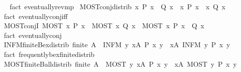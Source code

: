 \begin{isabellebody}
\isadelimproof
\ %
\endisadelimproof
%
\isatagproof
{}\isamarkupfalse%
\ {\isacharparenleft}fact\ eventually{\isacharunderscore}rev{\isacharunderscore}mp{\isacharparenright}%
\endisatagproof
{\isafoldproof}%
%
\isadelimproof
%
\endisadelimproof
\isanewline
{}\isamarkupfalse%
\ MOST{\isacharunderscore}conj{\isacharunderscore}distrib{\isacharcolon}\ {\isachardoublequoteopen}{\isacharparenleft}{\isasymforall}\isactrlsub {\isasyminfinity}x{\isachardot}\ P\ x\ {\isasymand}\ Q\ x{\isacharparenright}\ {\isasymlongleftrightarrow}\ {\isacharparenleft}{\isasymforall}\isactrlsub {\isasyminfinity}x{\isachardot}\ P\ x{\isacharparenright}\ {\isasymand}\ {\isacharparenleft}{\isasymforall}\isactrlsub {\isasyminfinity}x{\isachardot}\ Q\ x{\isacharparenright}{\isachardoublequoteclose}%
\isadelimproof
\ %
\endisadelimproof
%
\isatagproof
{}\isamarkupfalse%
\ {\isacharparenleft}fact\ eventually{\isacharunderscore}conj{\isacharunderscore}iff{\isacharparenright}%
\endisatagproof
{\isafoldproof}%
%
\isadelimproof
%
\endisadelimproof
\isanewline
{}\isamarkupfalse%
\ MOST{\isacharunderscore}conjI{\isacharcolon}\ {\isachardoublequoteopen}MOST\ x{\isachardot}\ P\ x\ {\isasymLongrightarrow}\ MOST\ x{\isachardot}\ Q\ x\ {\isasymLongrightarrow}\ MOST\ x{\isachardot}\ P\ x\ {\isasymand}\ Q\ x{\isachardoublequoteclose}%
\isadelimproof
\ %
\endisadelimproof
%
\isatagproof
{}\isamarkupfalse%
\ {\isacharparenleft}fact\ eventually{\isacharunderscore}conj{\isacharparenright}%
\endisatagproof
{\isafoldproof}%
%
\isadelimproof
%
\endisadelimproof
\isanewline
{}\isamarkupfalse%
\ INFM{\isacharunderscore}finite{\isacharunderscore}Bex{\isacharunderscore}distrib{\isacharcolon}\ {\isachardoublequoteopen}finite\ A\ {\isasymLongrightarrow}\ {\isacharparenleft}INFM\ y{\isachardot}\ {\isasymexists}x{\isasymin}A{\isachardot}\ P\ x\ y{\isacharparenright}\ {\isasymlongleftrightarrow}\ {\isacharparenleft}{\isasymexists}x{\isasymin}A{\isachardot}\ INFM\ y{\isachardot}\ P\ x\ y{\isacharparenright}{\isachardoublequoteclose}%
\isadelimproof
\ %
\endisadelimproof
%
\isatagproof
{}\isamarkupfalse%
\ {\isacharparenleft}fact\ frequently{\isacharunderscore}bex{\isacharunderscore}finite{\isacharunderscore}distrib{\isacharparenright}%
\endisatagproof
{\isafoldproof}%
%
\isadelimproof
%
\endisadelimproof
\isanewline
{}\isamarkupfalse%
\ MOST{\isacharunderscore}finite{\isacharunderscore}Ball{\isacharunderscore}distrib{\isacharcolon}\ {\isachardoublequoteopen}finite\ A\ {\isasymLongrightarrow}\ {\isacharparenleft}MOST\ y{\isachardot}\ {\isasymforall}x{\isasymin}A{\isachardot}\ P\ x\ y{\isacharparenright}\ {\isasymlongleftrightarrow}\ {\isacharparenleft}{\isasymforall}x{\isasymin}A{\isachardot}\ MOST\ y{\isachardot}\ P\ x\ y{\isacharparenright}{\isachardoublequoteclose}%

\end{isabellebody}

